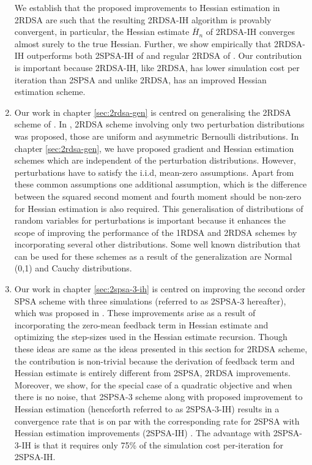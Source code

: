 \begin{enumerate}
We establish that the proposed improvements to Hessian estimation in 2RDSA are such  that the resulting 2RDSA-IH algorithm is provably convergent, in particular, the Hessian estimate $\overline H_n$ of 2RDSA-IH converges almost surely to the true Hessian. 
Further, we show empirically that 2RDSA-IH outperforms both 2SPSA-IH of \cite{spall-jacobian} and regular 2RDSA of \cite{prashanth2015rdsa}. Our contribution is important because 2RDSA-IH, like 2RDSA, has lower simulation cost per iteration than 2SPSA and unlike 2RDSA, has an improved Hessian estimation scheme.
\item Our work in chapter  \ref{sec:2rdsa-gen} is centred on generalising the 2RDSA scheme of \cite{prashanth2015rdsa}. In \cite{prashanth2015rdsa}, 2RDSA scheme involving only two perturbation distributions was proposed, those are uniform and asymmetric Bernoulli distributions. In chapter \ref{sec:2rdsa-gen}, we have proposed gradient and Hessian estimation schemes which are independent of the perturbation distributions. However, perturbations have to satisfy the i.i.d, mean-zero assumptions. Apart from these common assumptions  one additional assumption, which is the difference between the squared second moment  and fourth moment should be non-zero for Hessian estimation is also required. This generalisation of distributions of random variables for perturbations is important because it enhances the scope of improving the performance of the 1RDSA and 2RDSA schemes by incorporating several other distributions. Some well known distribution that can be used for these schemes as a result of the generalization are Normal (0,1) and Cauchy distributions.
\item Our work in chapter \ref{sec:2spsa-3-ih} is centred on improving the second order SPSA scheme with three simulations (referred to as 2SPSA-3 hereafter), which was proposed in  \cite{bhatnagar2015simultaneous}. These improvements arise as a result of incorporating the zero-mean feedback term in Hessian estimate and optimizing the step-sizes used in the Hessian estimate recursion. Though these ideas are same as the ideas presented in this section for 2RDSA scheme, the contribution is non-trivial because the derivation of feedback term and Hessian estimate is entirely different from 2SPSA, 2RDSA improvements. Moreover, we show, for the special case of a quadratic objective and when there is no noise, that 2SPSA-3 scheme along with proposed improvement to Hessian estimation (henceforth referred to as 2SPSA-3-IH) results in a convergence rate that is on par with the corresponding rate for 2SPSA with Hessian estimation improvements (2SPSA-IH) \cite{spall-jacobian}. The advantage with 2SPSA-3-IH is that it requires only 75\% of the simulation cost per-iteration for 2SPSA-IH.
\end{enumerate}

